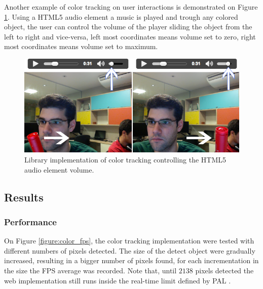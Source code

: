 Another example of color tracking on user interactions is demonstrated on Figure \ref{figure:color_volume}. Using a HTML5 audio element \cite{International2009} a music is played and trough any colored object, the user can control the volume of the player sliding the object from the left to right and vice-versa, left most coordinates means volume set to zero, right most coordinates means volume set to maximum.

\begin{figure}[!htb]
  \centering
  \includegraphics[width=\linewidth]{chapters/evaluation/color_volume.png}
  \caption{Library implementation of color tracking controlling the HTML5 audio element volume.}
  \label{figure:color_volume}
\end{figure}


\subsection{Results} %
\label{sub:evaluation:color_tracking_algorithm:results}

\subsubsection{Performance} %
\label{subsub:evaluation:color_tracking_algorithm:results:performance}

On Figure \ref{figure:color_fps}, the color tracking implementation were tested with different numbers of pixels detected. The size of the detect object were gradually increased, resulting in a bigger number of pixels found, for each incrementation in the size the FPS average was recorded. Note that, until $2138$ pixels detected the web implementation still runs inside the real-time limit defined by PAL \cite{PAL1962}.

